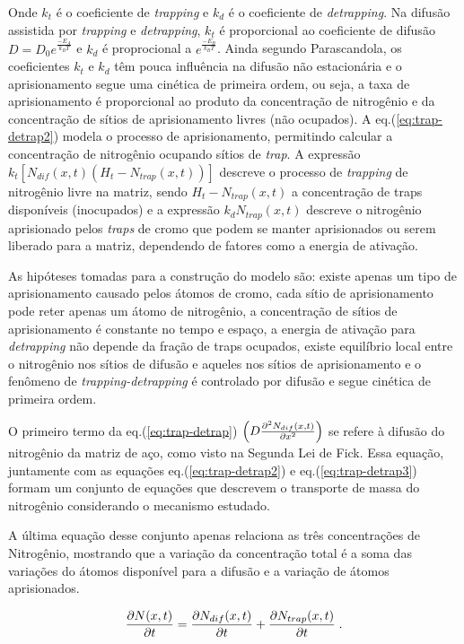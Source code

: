Onde $k_t$ é o coeficiente de \textit{trapping} e $k_d$ é o coeficiente de \textit{detrapping}. Na difusão assistida por \textit{trapping} e \textit{detrapping}, $k_t$ é proporcional ao coeficiente de difusão ${D=D_0e^{\frac{-E_A}{k_BT}}}$ e $k_d$ é proprocional a ${e^{\frac{-E_B}{k_BT}}}$. Ainda segundo Parascandola, os coeficientes $k_t$ e $k_d$ têm pouca influência na difusão não estacionária e o aprisionamento segue uma cinética de primeira ordem, ou seja, a taxa de aprisionamento é proporcional ao produto da concentração de nitrogênio e da concentração de sítios de aprisionamento livres (não ocupados). A eq.(\ref{eq:trap-detrap2}) modela o processo de aprisionamento, permitindo calcular a concentração de nitrogênio ocupando sítios de \textit{trap}. A expressão $k_t\left[N_{dif}(x,t)\left(H_t-N_{trap}(x,t)\right)\right]$ descreve o processo de \textit{trapping} de nitrogênio livre na matriz, sendo $H_t - N_{trap}(x,t)$ a concentração de traps disponíveis (inocupados) e a expressão $ k_dN_{trap}(x,t)$ descreve o nitrogênio aprisionado pelos \textit{traps} de cromo que podem se manter aprisionados ou serem liberado para a matriz, dependendo de fatores como a energia de ativação.


As hipóteses tomadas para a construção do modelo são: existe apenas um tipo de aprisionamento causado pelos átomos de cromo, cada sítio de aprisionamento pode reter apenas um átomo de nitrogênio, a concentração de sítios de aprisionamento é constante no tempo e espaço, a energia de ativação para  \textit{detrapping} não depende da fração de traps ocupados, existe equilíbrio local entre o nitrogênio nos sítios de difusão e aqueles nos sítios de aprisionamento e o fenômeno de \textit{trapping-detrapping} é controlado por difusão e segue cinética de primeira ordem.

O primeiro termo da eq.(\ref{eq:trap-detrap}) $\left(D\pdv[2]{N_{dif}(x,t)}{x}\right)$ se refere à difusão do nitrogênio da matriz de aço, como visto na Segunda Lei de Fick. Essa equação, juntamente com as equações eq.(\ref{eq:trap-detrap2}) e eq.(\ref{eq:trap-detrap3}) formam um conjunto de equações que descrevem o transporte de massa do nitrogênio considerando o mecanismo estudado.

A última equação desse conjunto apenas relaciona as três concentrações de Nitrogênio, mostrando que a variação da concentração total é a soma das variações do átomos disponível para a difusão e a variação de átomos aprisionados. 

\begin{equation}
\label{eq:trap-detrap3}
\pdv{N(x,t)}{t} = \pdv{N_{dif}(x,t)}{t} + \pdv{N_{trap}(x,t)}{t} \;.
\end{equation}

